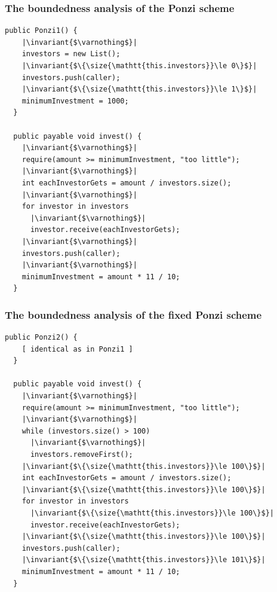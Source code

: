 \documentclass[11pt]{beamer}  %
\newcommand{\size}[1]{{#1}\mathtt{.size()}}
\newcommand{\invariant}[1]{\color{magenta}{#1}}
\begin{document}
\begin{frame}[fragile]\frametitle{The boundedness analysis of the Ponzi scheme}

  \begin{lstlisting}[language=pseudo,numbers=none]
  public Ponzi1() {
    |\invariant{$\varnothing$}|
    investors = new List();
    |\invariant{$\{\size{\mathtt{this.investors}}\le 0\}$}|
    investors.push(caller);
    |\invariant{$\{\size{\mathtt{this.investors}}\le 1\}$}|
    minimumInvestment = 1000;
  }

  public payable void invest() {
    |\invariant{$\varnothing$}|
    require(amount >= minimumInvestment, "too little");
    |\invariant{$\varnothing$}|
    int eachInvestorGets = amount / investors.size();
    |\invariant{$\varnothing$}|
    for investor in investors
      |\invariant{$\varnothing$}|
      investor.receive(eachInvestorGets);
    |\invariant{$\varnothing$}|
    investors.push(caller);
    |\invariant{$\varnothing$}|
    minimumInvestment = amount * 11 / 10;
  }
  \end{lstlisting}

\end{frame}

\begin{frame}[fragile]\frametitle{The boundedness analysis of the fixed Ponzi scheme}

  \begin{lstlisting}[language=pseudo,numbers=none]
  public Ponzi2() {
    [ identical as in Ponzi1 ]  
  }

  public payable void invest() {
    |\invariant{$\varnothing$}|
    require(amount >= minimumInvestment, "too little");
    |\invariant{$\varnothing$}|
    while (investors.size() > 100)
      |\invariant{$\varnothing$}|
      investors.removeFirst();
    |\invariant{$\{\size{\mathtt{this.investors}}\le 100\}$}|
    int eachInvestorGets = amount / investors.size();
    |\invariant{$\{\size{\mathtt{this.investors}}\le 100\}$}|
    for investor in investors
      |\invariant{$\{\size{\mathtt{this.investors}}\le 100\}$}|
      investor.receive(eachInvestorGets);
    |\invariant{$\{\size{\mathtt{this.investors}}\le 100\}$}|
    investors.push(caller);
    |\invariant{$\{\size{\mathtt{this.investors}}\le 101\}$}|
    minimumInvestment = amount * 11 / 10;
  }
  \end{lstlisting}
\end{frame}
\end{document}
